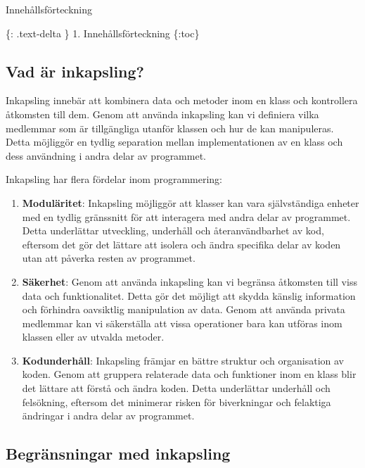 Innehållsförteckning

\{: .text-delta \} 1. Innehållsförteckning \{:toc\}

\hypertarget{vad-uxe4r-inkapsling}{%
\subsection{Vad är inkapsling?}\label{vad-uxe4r-inkapsling}}

Inkapsling innebär att kombinera data och metoder inom en klass och
kontrollera åtkomsten till dem. Genom att använda inkapsling kan vi
definiera vilka medlemmar som är tillgängliga utanför klassen och hur de
kan manipuleras. Detta möjliggör en tydlig separation mellan
implementationen av en klass och dess användning i andra delar av
programmet.

Inkapsling har flera fördelar inom programmering:

\begin{enumerate}
\def\labelenumi{\arabic{enumi}.}
\item
  \textbf{Moduläritet}: Inkapsling möjliggör att klasser kan vara
  självständiga enheter med en tydlig gränssnitt för att interagera med
  andra delar av programmet. Detta underlättar utveckling, underhåll och
  återanvändbarhet av kod, eftersom det gör det lättare att isolera och
  ändra specifika delar av koden utan att påverka resten av programmet.
\item
  \textbf{Säkerhet}: Genom att använda inkapsling kan vi begränsa
  åtkomsten till viss data och funktionalitet. Detta gör det möjligt att
  skydda känslig information och förhindra oavsiktlig manipulation av
  data. Genom att använda privata medlemmar kan vi säkerställa att vissa
  operationer bara kan utföras inom klassen eller av utvalda metoder.
\item
  \textbf{Kodunderhåll}: Inkapsling främjar en bättre struktur och
  organisation av koden. Genom att gruppera relaterade data och
  funktioner inom en klass blir det lättare att förstå och ändra koden.
  Detta underlättar underhåll och felsökning, eftersom det minimerar
  risken för biverkningar och felaktiga ändringar i andra delar av
  programmet.
\end{enumerate}

\hypertarget{begruxe4nsningar-med-inkapsling}{%
\subsection{Begränsningar med
inkapsling}\label{begruxe4nsningar-med-inkapsling}}

